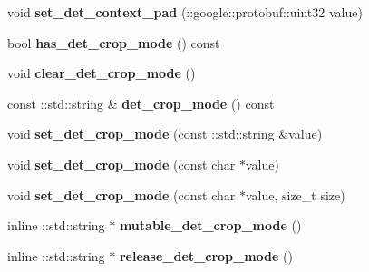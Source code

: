 \begin{DoxyCompactItemize}
void {\bfseries set\+\_\+det\+\_\+context\+\_\+pad} (\+::google\+::protobuf\+::uint32 value)
\item 
\mbox{\label{classcaffe_1_1_v0_layer_parameter_a8f96a4b447c223edb3614e552c073d81}} 
bool {\bfseries has\+\_\+det\+\_\+crop\+\_\+mode} () const
\item 
\mbox{\label{classcaffe_1_1_v0_layer_parameter_ae59db00c2283364d4a06716d7c7df32b}} 
void {\bfseries clear\+\_\+det\+\_\+crop\+\_\+mode} ()
\item 
\mbox{\label{classcaffe_1_1_v0_layer_parameter_aea4385691f92aa9e6a802d50355ab5a1}} 
const \+::std\+::string \& {\bfseries det\+\_\+crop\+\_\+mode} () const
\item 
\mbox{\label{classcaffe_1_1_v0_layer_parameter_a6298bb586a4f2a2154a9430537b3747c}} 
void {\bfseries set\+\_\+det\+\_\+crop\+\_\+mode} (const \+::std\+::string \&value)
\item 
\mbox{\label{classcaffe_1_1_v0_layer_parameter_a5a4c4d39382dfa9835d6f970b1ee1736}} 
void {\bfseries set\+\_\+det\+\_\+crop\+\_\+mode} (const char $\ast$value)
\item 
\mbox{\label{classcaffe_1_1_v0_layer_parameter_a554a184003803ca5021e3eff47579abe}} 
void {\bfseries set\+\_\+det\+\_\+crop\+\_\+mode} (const char $\ast$value, size\+\_\+t size)
\item 
\mbox{\label{classcaffe_1_1_v0_layer_parameter_a7b2eee39534824e26c7d96f147a8c1b5}} 
inline \+::std\+::string $\ast$ {\bfseries mutable\+\_\+det\+\_\+crop\+\_\+mode} ()
\item 
\mbox{\label{classcaffe_1_1_v0_layer_parameter_a9cb0ee76541bc5326bcdba8f0e02ab3b}} 
inline \+::std\+::string $\ast$ {\bfseries release\+\_\+det\+\_\+crop\+\_\+mode} ()
\item 
\mbox{\label{classcaffe_1_1_v0_layer_parameter_ae6e1371aa7df8e8d4ac3899e874c1f1a}} 

\end{DoxyCompactItemize}
